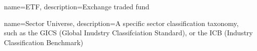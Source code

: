 \makeglossaries



{
    name=ETF,
    description={Exchange traded fund}
}


{
    name=Sector Universe,
    description={A specific sector classification taxonomy, such as the GICS (Global Inudstry Classifciation Standard), or the ICB (Industry Classification Benchmark)}
}
